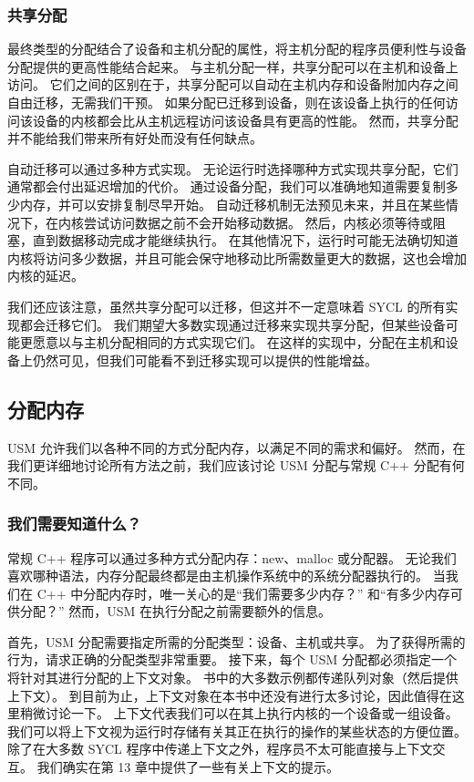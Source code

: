 \subsubsection{共享分配}
最终类型的分配结合了设备和主机分配的属性，将主机分配的程序员便利性与设备分配提供的更高性能结合起来。 与主机分配一样，共享分配可以在主机和设备上访问。 它们之间的区别在于，共享分配可以自动在主机内存和设备附加内存之间自由迁移，无需我们干预。 如果分配已迁移到设备，则在该设备上执行的任何访问该设备的内核都会比从主机远程访问该设备具有更高的性能。 然而，共享分配并不能给我们带来所有好处而没有任何缺点。

自动迁移可以通过多种方式实现。 无论运行时选择哪种方式实现共享分配，它们通常都会付出延迟增加的代价。 通过设备分配，我们可以准确地知道需要复制多少内存，并可以安排复制尽早开始。 自动迁移机制无法预见未来，并且在某些情况下，在内核尝试访问数据之前不会开始移动数据。 然后，内核必须等待或阻塞，直到数据移动完成才能继续执行。 在其他情况下，运行时可能无法确切知道内核将访问多少数据，并且可能会保守地移动比所需数量更大的数据，这也会增加内核的延迟。

我们还应该注意，虽然共享分配可以迁移，但这并不一定意味着 SYCL 的所有实现都会迁移它们。 我们期望大多数实现通过迁移来实现共享分配，但某些设备可能更愿意以与主机分配相同的方式实现它们。 在这样的实现中，分配在主机和设备上仍然可见，但我们可能看不到迁移实现可以提供的性能增益。

\subsection{分配内存}
USM 允许我们以各种不同的方式分配内存，以满足不同的需求和偏好。 然而，在我们更详细地讨论所有方法之前，我们应该讨论 USM 分配与常规 C++ 分配有何不同。

\subsubsection{我们需要知道什么？}
常规 C++ 程序可以通过多种方式分配内存：new、malloc 或分配器。 无论我们喜欢哪种语法，内存分配最终都是由主机操作系统中的系统分配器执行的。 当我们在 C++ 中分配内存时，唯一关心的是“我们需要多少内存？” 和“有多少内存可供分配？” 然而，USM 在执行分配之前需要额外的信息。

首先，USM 分配需要指定所需的分配类型：设备、主机或共享。 为了获得所需的行为，请求正确的分配类型非常重要。 接下来，每个 USM 分配都必须指定一个将针对其进行分配的上下文对象。 书中的大多数示例都传递队列对象（然后提供上下文）。 到目前为止，上下文对象在本书中还没有进行太多讨论，因此值得在这里稍微讨论一下。 上下文代表我们可以在其上执行内核的一个设备或一组设备。 我们可以将上下文视为运行时存储有关其正在执行的操作的某些状态的方便位置。 除了在大多数 SYCL 程序中传递上下文之外，程序员不太可能直接与上下文交互。 我们确实在第 13 章中提供了一些有关上下文的提示。

